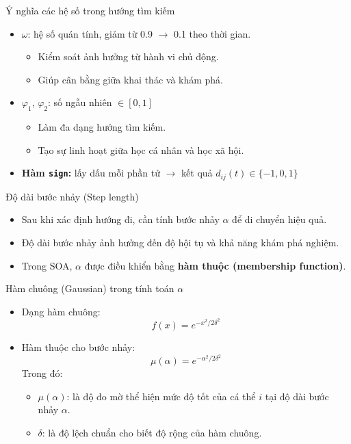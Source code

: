 \documentclass[10pt]{beamer}
\begin{document}
\begin{frame}{Ý nghĩa các hệ số trong hướng tìm kiếm}
\begin{itemize}
    \item $\omega$: hệ số quán tính, giảm từ 0.9 $\to$ 0.1 theo thời gian.
    \begin{itemize}
        \item Kiểm soát ảnh hưởng từ hành vi chủ động.
        \item Giúp cân bằng giữa khai thác và khám phá.
    \end{itemize}
    
    \item $\varphi_1$, $\varphi_2$: số ngẫu nhiên $\in [0,1]$
    \begin{itemize}
        \item Làm đa dạng hướng tìm kiếm.
        \item Tạo sự linh hoạt giữa học cá nhân và học xã hội.
    \end{itemize}
    \item \textbf{Hàm \texttt{sign}:} lấy dấu mỗi phần tử $\to$ kết quả $d_{ij}(t) \in \{-1, 0, 1\}$
\end{itemize}
\end{frame}

\begin{frame}{Độ dài bước nhảy (Step length)}
\begin{itemize}
    \item Sau khi xác định hướng đi, cần tính bước nhảy $\alpha$ để di chuyển hiệu quả.
    \item Độ dài bước nhảy ảnh hưởng đến độ hội tụ và khả năng khám phá nghiệm.
    \item Trong SOA, $\alpha$ được điều khiển bằng \textbf{hàm thuộc (membership function)}.
\end{itemize}
\end{frame}

\begin{frame}{Hàm chuông (Gaussian) trong tính toán $\alpha$}
\begin{itemize}
    \item Dạng hàm chuông:
    \[
    f(x) = e^{-x^2 / 2\delta^2}
    \]
    \item Hàm thuộc cho bước nhảy:
    \[
    \mu(\alpha) = e^{-\alpha^2 / 2\delta^2}
    \]
Trong đó:
    \begin{itemize}
        \item $\mu(\alpha)$: là độ đo mờ thể hiện mức độ tốt của cá thể $i$ tại độ dài bước nhảy $\alpha$.
        \item $\delta$: là độ lệch chuẩn cho biết độ rộng của hàm chuông.
    \end{itemize}
\end{itemize}
\end{frame}
\end{document}
